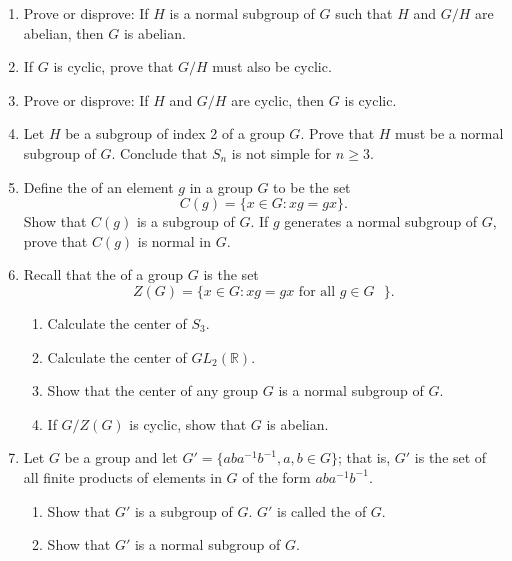 {{\begin{enumerate}
\item
Prove or disprove: If $H$ is a normal subgroup of $G$ such that $H$
and $G/H$ are abelian, then $G$ is abelian. 
 
 

\item
If $G$ is cyclic, prove that $G/H$ must also be cyclic.


\item
Prove or disprove: If $H$ and $G/H$ are cyclic, then $G$ is cyclic.
 
 
\item
Let $H$ be a subgroup of index 2 of a group $G$. Prove that $H$ must
be a normal subgroup of $G$. Conclude that $S_n$ is not simple for $n \geq 3$.



\item
Define the  of an element $g$ in a group $G$
to be the set  
\[
C(g) = \{ x \in G : xg = gx \}.
\]
Show that $C(g)$ is a subgroup of $G$.  If $g$ generates a normal
subgroup of $G$, prove that $C(g)$ is normal in $G$.
 
 
\item
Recall that the  of a group $G$ is
the set 
\[
Z(G) = \{ x \in G : xg = gx \mbox{ for all $g \in G$ } \}.
\]
\begin{enumerate}
 
 \item
Calculate the center of $S_3$.
 
 \item
Calculate the center of $GL_2 ( {\mathbb R} )$.
 
 \item
Show that the center of any group $G$ is a normal subgroup of $G$. 
 
 \item
If $G / Z(G)$ is cyclic, show that $G$ is abelian.
 
\end{enumerate}

\item
Let $G$ be a group and let $G' = \{ aba^{- 1} b^{-1}, a,b \in G \}$;
that is, $G'$ is the set of all finite products of elements in
$G$ of the form $aba^{-1}b^{-1}$.  
\begin{enumerate}
 \item
Show that $G'$ is a subgroup of $G$. $G'$ is called the
\label{commutatorsubgroup} of $G$.  
 \item
Show that $G'$ is a normal subgroup of $G$.


\end{enumerate}
\end{enumerate}}}
